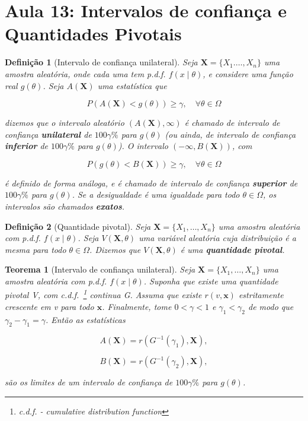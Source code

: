\documentclass{article}
\newtheorem{theorem}{Teorema}
\newtheorem{definition}{Definição}
\begin{document}
\section*{Aula 13: Intervalos de confiança e Quantidades Pivotais}
\label{s13}
\begin{definition}[Intervalo de confiança unilateral]
Seja $\textbf{X} = \{ X_1. \ldots, X_n \}$ uma amostra aleatória, onde cada uma tem p.d.f. $f(x \mid \theta)$, e considere uma função real $g(\theta)$. Seja $A( \textbf{X})$ uma estatística que

$$P(A(\textbf{X}) < g(\theta)) \geq \gamma, \quad \forall \theta \in \Omega$$

dizemos que o intervalo aleatório $( A(\textbf{X}), \infty)$ é chamado de intervalo de confiança \textbf{unilateral} de $100\gamma \%$ para $g(\theta)$ (ou ainda, de intervalo de confiança \textbf{inferior} de $100\gamma \%$ para $g(\theta)$). O intervalo $(-\infty, B(\textbf{X}))$, com

$$P(g(\theta) < B(\textbf{X})) \geq \gamma, \quad \forall \theta \in \Omega$$

é definido de forma análoga, e é chamado de intervalo de confiança \textbf{superior} de $100\gamma \%$ para $g(\theta)$. Se a desigualdade é uma igualdade para todo $\theta \in \Omega$, os intervalos são chamados \textbf{exatos}.
\end{definition}

\begin{definition}[Quantidade pivotal]
Seja $\textbf{X} = \{ X_1, \ldots, X_n \}$ uma amostra aleatória com p.d.f. $f(x \mid \theta)$. Seja $V(\textbf{X}, \theta)$ uma variável aleatória cuja distribuição é a mesma para todo $\theta \in \Omega$. Dizemos que $V(\textbf{X}, \theta)$ é uma \textbf{quantidade pivotal}.
\end{definition}

\begin{theorem}[Intervalo de confiança unilateral]
Seja $\textbf{X} = \{ X_1, \ldots, X_n \}$ uma amostra aleatória com p.d.f. $f(x \mid \theta)$. Suponha que existe uma quantidade pivotal V, com c.d.f.~\footnote{c.d.f. - cumulative distribution function} continua G. Assuma que existe $r(v, \textbf{x})$ estritamente crescente em v para todo $\textbf{x}$. Finalmente, tome $0 < \gamma < 1$ e $\gamma_1 < \gamma_2$ de modo que $\gamma_2 - \gamma_1 = \gamma$. Então as estatísticas

$$A(\textbf{X}) = r(G^{-1}(\gamma_1), \textbf{X}),$$

$$B(\textbf{X}) = r(G^{-1}(\gamma_2), \textbf{X}),$$

são os limites de um intervalo de confiança de $100\gamma \%$ para $g(\theta)$.
\end{theorem}
\end{document}
